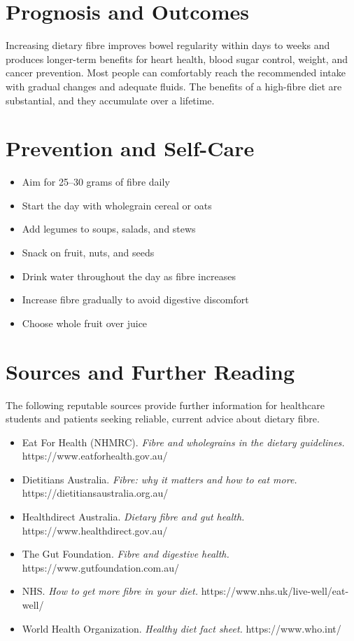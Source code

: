 \section*{Prognosis and Outcomes}
Increasing dietary fibre improves bowel regularity within days to weeks and produces longer-term benefits for heart health, blood sugar control, weight, and cancer prevention. Most people can comfortably reach the recommended intake with gradual changes and adequate fluids. The benefits of a high-fibre diet are substantial, and they accumulate over a lifetime.

\section*{Prevention and Self-Care}
\begin{itemize}
    \item Aim for 25--30 grams of fibre daily
    \item Start the day with wholegrain cereal or oats
    \item Add legumes to soups, salads, and stews
    \item Snack on fruit, nuts, and seeds
    \item Drink water throughout the day as fibre increases
    \item Increase fibre gradually to avoid digestive discomfort
    \item Choose whole fruit over juice
\end{itemize}

\section*{Sources and Further Reading}
The following reputable sources provide further information for healthcare students and patients seeking reliable, current advice about dietary fibre.

\begin{itemize}
    \item Eat For Health (NHMRC). \textit{Fibre and wholegrains in the dietary guidelines.} https://www.eatforhealth.gov.au/
    \item Dietitians Australia. \textit{Fibre: why it matters and how to eat more.} https://dietitiansaustralia.org.au/
    \item Healthdirect Australia. \textit{Dietary fibre and gut health.} https://www.healthdirect.gov.au/
    \item The Gut Foundation. \textit{Fibre and digestive health.} https://www.gutfoundation.com.au/
    \item NHS. \textit{How to get more fibre in your diet.} https://www.nhs.uk/live-well/eat-well/
    \item World Health Organization. \textit{Healthy diet fact sheet.} https://www.who.int/
\end{itemize}

